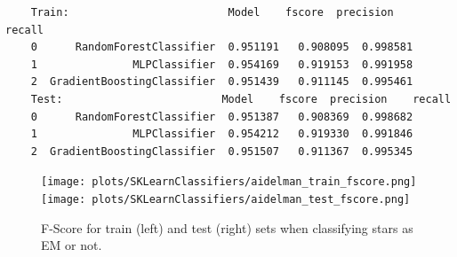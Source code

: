 \documentclass{article}
\begin{document}
\begin{verbatim}    
    Train:                         Model    fscore  precision    recall
    0      RandomForestClassifier  0.951191   0.908095  0.998581
    1               MLPClassifier  0.954169   0.919153  0.991958
    2  GradientBoostingClassifier  0.951439   0.911145  0.995461
    Test:                         Model    fscore  precision    recall
    0      RandomForestClassifier  0.951387   0.908369  0.998682
    1               MLPClassifier  0.954212   0.919330  0.991846
    2  GradientBoostingClassifier  0.951507   0.911367  0.995345
\end{verbatim}
    
\begin{figure}
    \texttt{[image: plots/SKLearnClassifiers/aidelman\_train\_fscore.png]}
    \texttt{[image: plots/SKLearnClassifiers/aidelman\_test\_fscore.png]}
    \caption{F-Score for train (left) and test (right) sets when classifying stars as EM or not.}
\end{figure}
\end{document}
